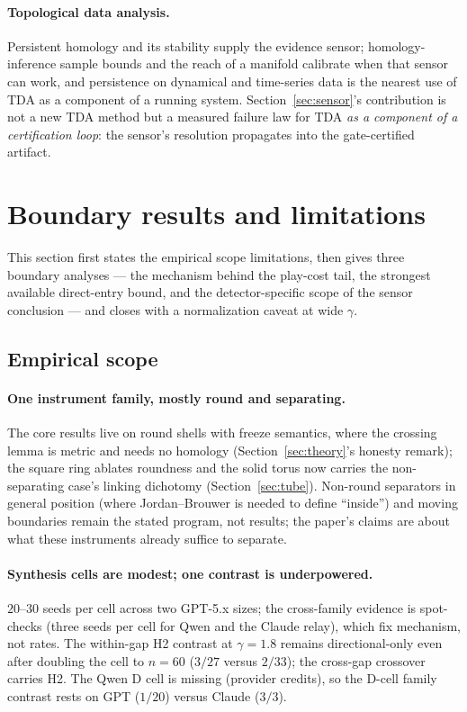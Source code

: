 \documentclass[11pt]{article}
\theoremstyle{remark}
\begin{document}
\paragraph{Topological data analysis.} Persistent homology and its
stability \citep{edelsbrunner2010computational, cohensteiner2007stability}
supply the evidence sensor; homology-inference sample bounds
\citep{niyogi2008finding} and the reach of a manifold
\citep{federer1959curvature} calibrate when that sensor can work, and
persistence on dynamical and time-series data
\citep{perea2015sliding, khasawneh2016chatter} is the nearest use of TDA
as a component of a running system.
Section~\ref{sec:sensor}'s contribution is not a new TDA method but a
measured failure law for TDA \emph{as a component of a certification
loop}: the sensor's resolution propagates into the gate-certified
artifact.

\section{Boundary results and limitations}
\label{sec:limitations}

This section first states the empirical scope limitations, then gives
three boundary analyses --- the mechanism behind the play-cost tail, the
strongest available direct-entry bound, and the detector-specific scope
of the sensor conclusion --- and closes with a normalization caveat at
wide $\gamma$.

\subsection{Empirical scope}

\paragraph{One instrument family, mostly round and separating.} The core
results live on round shells with freeze semantics, where the crossing
lemma is metric and needs no homology (Section~\ref{sec:theory}'s honesty
remark); the square ring ablates roundness and the solid torus now
carries the non-separating case's linking dichotomy
(Section~\ref{sec:tube}). Non-round separators in general position (where
Jordan--Brouwer is needed to define ``inside'') and moving boundaries
remain the stated program, not results; the paper's claims are about what
these instruments already suffice to separate.

\paragraph{Synthesis cells are modest; one contrast is underpowered.}
$20$--$30$ seeds per cell across two GPT-5.x sizes; the cross-family
evidence is spot-checks (three seeds per cell for Qwen and the Claude
relay), which fix mechanism, not rates. The within-gap H2 contrast at
$\gamma = 1.8$ remains directional-only even after doubling the cell to
$n = 60$ ($3/27$ versus $2/33$); the cross-gap crossover carries H2.
The Qwen D cell is missing (provider credits), so the D-cell family
contrast rests on GPT ($1/20$) versus Claude ($3/3$).
\end{document}
